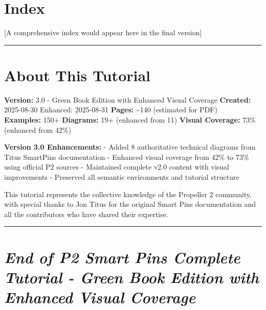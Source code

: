 \documentclass[11pt,a4paper,oneside,english]{book}
\begin{document}
\clearpage

\clearpage

\hypertarget{index}{%
\chapter{Index}\label{index}}

{[}A comprehensive index would appear here in the final version{]}

\begin{center}\rule{0.5\linewidth}{0.5pt}\end{center}

\clearpage

\hypertarget{about-this-tutorial}{%
\chapter{About This Tutorial}\label{about-this-tutorial}}

\textbf{Version:} 3.0 - Green Book Edition with Enhanced Visual Coverage
\textbf{Created:} 2025-08-30 \textbar{} Enhanced: 2025-08-31
\textbf{Pages:} \textasciitilde140 (estimated for PDF)\\
\textbf{Examples:} 150+ \textbf{Diagrams:} 19+ (enhanced from 11)
\textbf{Visual Coverage:} 73\% (enhanced from 42\%)

\textbf{Version 3.0 Enhancements:} - Added 8 authoritative technical
diagrams from Titus SmartPins documentation - Enhanced visual coverage
from 42\% to 73\% using official P2 sources - Maintained complete v2.0
content with visual improvements - Preserved all semantic environments
and tutorial structure

This tutorial represents the collective knowledge of the Propeller 2
community, with special thanks to Jon Titus for the original Smart Pins
documentation and all the contributors who have shared their expertise.

\begin{center}\rule{0.5\linewidth}{0.5pt}\end{center}

\clearpage

\hypertarget{end-of-p2-smart-pins-complete-tutorial---green-book-edition-with-enhanced-visual-coverage}{%
\chapter{\texorpdfstring{\emph{End of P2 Smart Pins Complete Tutorial -
Green Book Edition with Enhanced Visual
Coverage}}{End of P2 Smart Pins Complete Tutorial - Green Book Edition with Enhanced Visual Coverage}}\label{end-of-p2-smart-pins-complete-tutorial---green-book-edition-with-enhanced-visual-coverage}}
\end{document}
